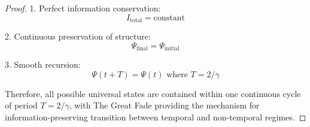 \documentclass{article}
\begin{document}
\begin{proof}
1. Perfect information conservation:
   \begin{equation}
   I_{\text{total}} = \text{constant}
   \end{equation}

2. Continuous preservation of structure:
   \begin{equation}
   \Psi_{\text{final}} = \Psi_{\text{initial}}
   \end{equation}

3. Smooth recursion:
   \begin{equation}
   \Psi(t + T) = \Psi(t) \text{ where } T = 2/\gamma
   \end{equation}

Therefore, all possible universal states are contained within one continuous cycle of period $T = 2/\gamma$, with The Great Fade providing the mechanism for information-preserving transition between temporal and non-temporal regimes.
\end{proof}
\end{document}
